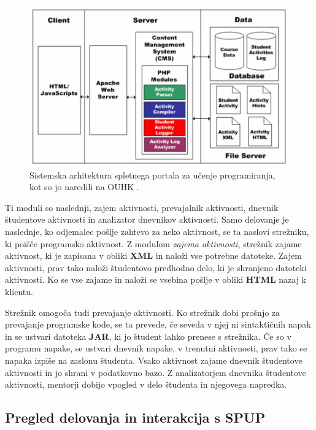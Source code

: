 \begin{figure}[htb!] \centering
  \includegraphics[width=0.9\linewidth, keepaspectratio =
1]{./images/SystemArch01_OUHK_DistanceEdu.jpg}
  \caption{Sistemska arhitektura spletnega portala za učenje
    programiranja, kot so jo naredili na OUHK \cite{ITaLCP_DistanceEdu}.}
  \label{fig:OUHK_cmsArch}
\end{figure}

Ti moduli so naslednji, zajem aktivnosti, prevajalnik aktivnosti,
dnevnik študentove aktivnosti in analizator dnevnikov aktivnosti. Samo
delovanje je naslednje, ko odjemalec pošlje zahtevo za neko aktivnost,
se ta naslovi strežniku, ki poišče programsko aktivnost. Z modulom
\emph{zajema aktivnosti}, strežnik zajame aktivnost, ki je zapisana v
obliki \textbf{XML} in naloži vse potrebne datoteke. Zajem aktivnosti,
prav tako naloži študentovo predhodno delo, ki je shranjeno datoteki
aktivnosti. Ko se vse zajame in naloži se vsebina pošlje v obliki
\textbf{HTML} nazaj k klientu.

Strežnik omogoča tudi prevajanje aktivnosti. Ko strežnik dobi prošnjo
za prevajanje programske kode, se ta prevede, če seveda v njej ni
sintaktičnih napak in se ustvari datoteka \textbf{JAR}, ki jo študent
lahko prenese s strežnika. Če so v programu napake, se ustvari dnevnik
napake, v trenutni aktivnosti, prav tako se napaka izpiše na zaslonu
študenta. Vsako aktivnost zajame dnevnik študentove aktivnosti in jo shrani v
podatkovno bazo. Z analizatorjem dnevnika študentove aktivnosti,
mentorji dobijo vpogled v delo študenta in njegovega napredka.


\subsection{Pregled delovanja in interakcija s SPUP}
\label{sec:pregled_delovanja_in_interakcija}

